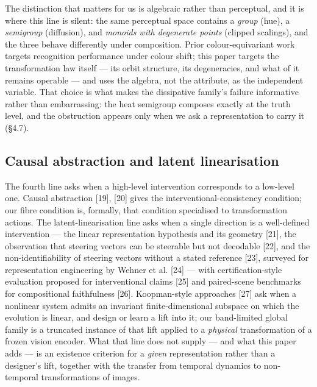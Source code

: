 The distinction that matters for us is algebraic rather than perceptual, and it is where this line is silent: the same perceptual space contains a \textit{group} (hue), a \textit{semigroup} (diffusion), and \textit{monoids with degenerate points} (clipped scalings), and the three behave differently under composition. Prior colour-equivariant work targets recognition performance under colour shift; this paper targets the transformation law itself --- its orbit structure, its degeneracies, and what of it remains operable --- and uses the algebra, not the attribute, as the independent variable. That choice is what makes the dissipative family's failure informative rather than embarrassing: the heat semigroup composes exactly at the truth level, and the obstruction appears only when we ask a representation to carry it (\S{}4.7).

\subsection{Causal abstraction and latent linearisation}

The fourth line asks when a high-level intervention corresponds to a low-level one. Causal abstraction [19], [20] gives the interventional-consistency condition; our fibre condition is, formally, that condition specialised to transformation actions. The latent-linearisation line asks when a single direction is a well-defined intervention --- the linear representation hypothesis and its geometry [21], the observation that steering vectors can be steerable but not decodable [22], and the non-identifiability of steering vectors without a stated reference [23], surveyed for representation engineering by Wehner et al. [24] --- with certification-style evaluation proposed for interventional claims [25] and paired-scene benchmarks for compositional faithfulness [26]. Koopman-style approaches [27] ask when a nonlinear system admits an invariant finite-dimensional subspace on which the evolution is linear, and design or learn a lift into it; our band-limited global family is a truncated instance of that lift applied to a \textit{physical} transformation of a frozen vision encoder. What that line does not supply --- and what this paper adds --- is an existence criterion for a \textit{given} representation rather than a designer's lift, together with the transfer from temporal dynamics to non-temporal transformations of images.

